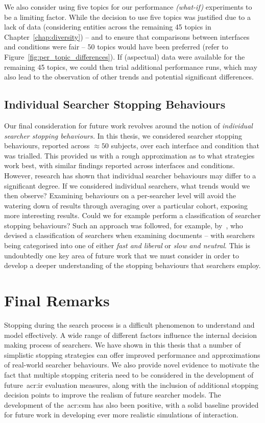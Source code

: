 We also consider using five topics for our performance \emph{(what-if)} experiments to be a limiting factor. While the decision to use five topics was justified due to a lack of data (considering entities across the remaining 45 topics in Chapter~\ref{chap:diversity}) -- and to ensure that comparisons between interfaces and conditions were fair -- 50 topics would have been preferred (refer to Figure~\ref{fig:per_topic_differences}). If (aspectual) data were available for the remaining 45 topics, we could then trial additional performance runs, which may also lead to the observation of other trends and potential significant differences.

\subsection{Individual Searcher Stopping Behaviours}
Our final consideration for future work revolves around the notion of \emph{individual searcher stopping behaviours.} In this thesis, we considered searcher stopping behaviours, reported across $\approx50$ subjects, over each interface and condition that was trialled. This provided us with a rough approximation as to what strategies work best, with similar findings reported across interfaces and conditions. However, research has shown that individual searcher behaviours may differ to a significant degree. If we considered individual searchers, what trends would we then observe? Examining behaviours on a per-searcher level will avoid the watering down of results through averaging over a particular cohort, exposing more interesting results. Could we for example perform a classification of searcher stopping behaviours? Such an approach was followed, for example, by~\cite{smucker2011user_strategies}, who devised a classification of searchers when examining documents -- with searchers being categorised into one of either \emph{fast and liberal} or \emph{slow and neutral}. This is undoubtedly one key area of future work that we must consider in order to develop a deeper understanding of the stopping behaviours that searchers employ.

\section{Final Remarks}\label{sec:conclusions:remarks}
Stopping during the search process is a difficult phenomenon to understand and model effectively. A wide range of different factors influence the internal decision making process of searchers. We have shown in this thesis that a number of simplistic stopping strategies can offer improved performance and approximations of real-world searcher behaviours. We also provide novel evidence to motivate the fact that multiple stopping criteria need to be considered in the development of future~\gls{acr:ir} evaluation measures, along with the inclusion of additional stopping decision points to improve the realism of future searcher models. The development of the~\gls{acr:csm} has also been positive, with a solid baseline provided for future work in developing ever more realistic simulations of interaction.

